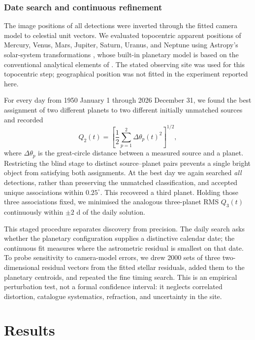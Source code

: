 \documentclass{aa}
\begin{document}
\subsubsection{Date search and continuous refinement}

The image positions of all detections were inverted through the fitted camera
model to celestial unit vectors. We evaluated topocentric apparent positions
of Mercury, Venus, Mars, Jupiter, Saturn, Uranus, and Neptune using Astropy's
solar-system transformations \citep{Astropy2022}, whose built-in planetary
model is based on the conventional analytical elements of \citet{Simon1994}.
The stated observing site was used for this topocentric step; geographical
position was not fitted in the experiment reported here.

For every day from 1950 January 1 through 2026 December 31, we found the best
assignment of two different planets to two different initially unmatched
sources and recorded
\begin{equation}
  Q_2(t)=\left[\frac{1}{2}\sum_{p=1}^{2}
       \Delta\theta_p(t)^2\right]^{1/2},
  \label{eq:q2}
\end{equation}
where $\Delta\theta_p$ is the great-circle distance between a measured source
and a planet. Restricting the blind stage to distinct source--planet pairs
prevents a single bright object from satisfying both assignments. At the best
day we again searched \emph{all} detections, rather than preserving the
unmatched classification, and accepted unique associations within
$0.25^\circ$. This recovered a third planet. Holding those three associations
fixed, we minimised the analogous three-planet RMS $Q_3(t)$ continuously within
$\pm2$ d of the daily solution.

This staged procedure separates discovery from precision. The daily search
asks whether the planetary configuration supplies a distinctive calendar date;
the continuous fit measures where the astrometric residual is smallest on that
date. To probe sensitivity to camera-model errors, we drew 2000 sets of three
two-dimensional residual vectors from the fitted stellar residuals, added them
to the planetary centroids, and repeated the fine timing search. This is an
empirical perturbation test, not a formal confidence interval: it neglects
correlated distortion, catalogue systematics, refraction, and uncertainty in
the site.

\section{Results}
\label{sec:results}
\end{document}
